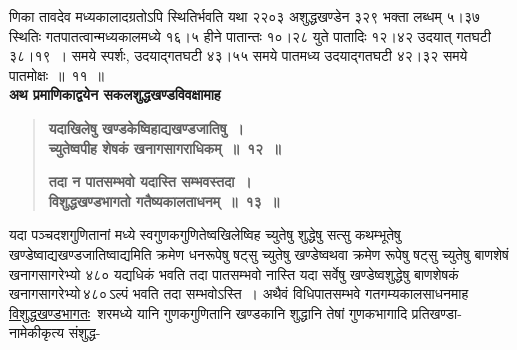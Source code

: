 \documentclass[11pt, openany]{book}
\begin{document}
\newpage

\begin{sloppypar}
\noindent णिका तावदेव मध्यकालादग्रतोऽपि स्थितिर्भवति यथा २२०३ अशुद्धखण्डेन ३२९ भक्ता लब्धम् ५।३७ स्थितिः गतपातत्वान्मध्यकालमध्ये १६।५ हीने पातान्तः १०।२८ युते पातादिः १२।४२ उदयात् गतघटी ३८।१९~। समये स्पर्शः, उदयाद्गतघटी ४३।५५ समये पातमध्य उदयाद्गतघटी ४२।३२ समये पातमोक्षः~॥~११~॥\\

{\small \textbf{अथ प्रमाणिकाद्वयेन सकलशुद्धखण्डविवक्षामाह\textendash }}

 \label{9.12}
\begin{quote}
{\large \textbf{{\color{purple}यदाखिलेषु खण्डकेष्विहाद्यखण्डजातिषु~। \\
च्युतेष्वपीह शेषकं खनागसागराधिकम्~॥~१२~॥}}
\vspace{1mm}

 \label{9.13}
\textbf{{\color{purple}तदा न पातसम्भवो यदास्ति सम्भवस्तदा~। \\
विशुद्धखण्डभागतो गतैष्यकालताधनम्~॥~१३~॥}}}
\end{quote}

यदा पञ्चदशगुणितानां मध्ये स्वगुणकगुणितेष्वखिलेष्विह च्युतेषु शुद्धेषु सत्सु कथम्भूतेषु खण्डेष्वाद्यखण्डजातिष्वाद्यमिति क्रमेण धनरूपेषु षट्सु च्युतेषु खण्डेष्वथवा क्रमेण रूपेषु षट्सु च्युतेषु बाणशेषं खनागसागरेभ्यो ४८० यद्यधिकं भवति तदा पातसम्भवो नास्ति यदा सर्वेषु खण्डेष्वशुद्धेषु बाणशेषकं खनागसागरेभ्यो\textendash \,४८०\textendash \,ऽल्पं भवति तदा सम्भवोऽस्ति~। अथैवं विधिपातसम्भवे गतगम्यकालसाधनमाह\textendash \,\hyperref[9.13]{विशुद्धखण्डभागतः}~शरमध्ये यानि गुणकगुणितानि खण्डकानि शुद्धानि तेषां गुणकभागादि प्रतिखण्डा-नामेकीकृत्य संशुद्ध-
\end{sloppypar}

\newpage
\end{document}
